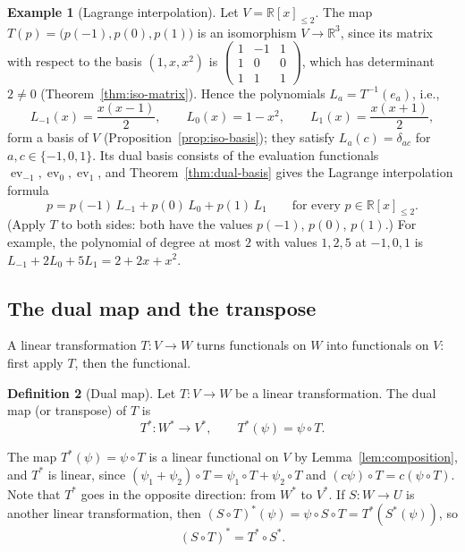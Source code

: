 \documentclass[11pt]{article}
\theoremstyle{definition}
\newtheorem{definition}{Definition}[section]
\newtheorem{example}[definition]{Example}
\theoremstyle{plain}
\theoremstyle{remark}
\begin{document}
\begin{example}[Lagrange interpolation]\label{ex:lagrange}
    Let $V = \mathbb{R}[x]_{\leq 2}$. The map $T(p) = \big(p(-1), p(0), p(1)\big)$ is an isomorphism $V \to \mathbb{R}^3$, since its matrix with respect to the basis $(1, x, x^2)$ is $\begin{pmatrix} 1 & -1 & 1 \\ 1 & 0 & 0 \\ 1 & 1 & 1 \end{pmatrix}$, which has determinant $2 \neq 0$ (Theorem~\ref{thm:iso-matrix}). Hence the polynomials $L_a = T^{-1}(e_a)$, i.e.,
    \[L_{-1}(x) = \frac{x(x - 1)}{2}, \qquad L_0(x) = 1 - x^2, \qquad L_1(x) = \frac{x(x + 1)}{2},\]
    form a basis of $V$ (Proposition~\ref{prop:iso-basis}); they satisfy $L_a(c) = \delta_{ac}$ for $a, c \in \{-1, 0, 1\}$. Its dual basis consists of the evaluation functionals $\operatorname{ev}_{-1}, \operatorname{ev}_0, \operatorname{ev}_1$, and Theorem~\ref{thm:dual-basis} gives the Lagrange interpolation formula
    \[p = p(-1)\, L_{-1} + p(0)\, L_0 + p(1)\, L_1 \qquad \text{for every } p \in \mathbb{R}[x]_{\leq 2}.\]
    (Apply $T$ to both sides: both have the values $p(-1)$, $p(0)$, $p(1)$.) For example, the polynomial of degree at most $2$ with values $1, 2, 5$ at $-1, 0, 1$ is $L_{-1} + 2L_0 + 5L_1 = 2 + 2x + x^2$.
\end{example}

\subsection{The dual map and the transpose}

A linear transformation $T: V \to W$ turns functionals on $W$ into functionals on $V$: first apply $T$, then the functional.

\begin{definition}[Dual map]
    Let $T: V \to W$ be a linear transformation. The dual map (or transpose) of $T$ is
    \[T^*: W^* \to V^*, \qquad T^*(\psi) = \psi \circ T.\]
\end{definition}

The map $T^*(\psi) = \psi \circ T$ is a linear functional on $V$ by Lemma~\ref{lem:composition}, and $T^*$ is linear, since $(\psi_1 + \psi_2) \circ T = \psi_1 \circ T + \psi_2 \circ T$ and $(c\psi) \circ T = c(\psi \circ T)$. Note that $T^*$ goes in the opposite direction: from $W^*$ to $V^*$. If $S: W \to U$ is another linear transformation, then $(S \circ T)^*(\psi) = \psi \circ S \circ T = T^*(S^*(\psi))$, so
\[(S \circ T)^* = T^* \circ S^*.\]
\end{document}
